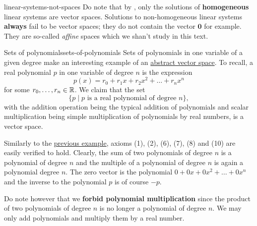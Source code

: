 \begin{remark}{}{linear-systems-not-spaces}
 Do note that by
 , only the
 solutions of \textbf{homogeneous} linear systems are vector spaces. Solutions
 to non-homogeneous linear systems \textbf{always} fail to be vector spaces;
 they do not contain the vector $\mathbf{0}$ for example. They are so-called
 \emph{affine} spaces which we shan't study in this text.
\end{remark}

\begin{example}{Sets of polynomials}{sets-of-polynomials}
 Sets of polynomials in one variable of a given degree make an interesting
 example of an \hyperref[def:abstract-vector-space]{abstract vector space}. To
 recall, a real polynomial $p$ in one variable of degree $n$ is the expression
 \[
  p(x) = r_0 + r_1x + r_2x^2 + \ldots + r_n x^{n}
 \]
 for some $r_0,\ldots,r_n \in \mathbb{R}$. We claim that the set
 \[
  \{p \mid p \text{ is a real polynomial of degree } n\},
 \]
 with the addition operation being the typical addition of polynomials and
 scalar multiplication being simple multiplication of polynomials by real
 numbers, is a vector space.

 Similarly to the
 \hyperref[exam:solution-sets-of-homogeneous-linear-systems]{previous example},
 axioms (1), (2), (6), (7), (8) and (10) are easily verified to hold. Clearly,
 the sum of two polynomials of degree $n$ is a polynomial of degree $n$ and the
 multiple of a polynomial of degree $n$ is again a polynomial degree $n$. The
 zero vector is the polynomial $0 + 0x + 0x^2 + \ldots + 0x^{n}$ and the inverse
 to the polynomial $p$ is of course $-p$.

 Do note however that we \textbf{forbid polynomial multiplication} since the
 product of two polynomials of degree $n$ is no longer a polynomial of degree
 $n$. We may only add polynomials and multiply them by a real number.


\end{example}
